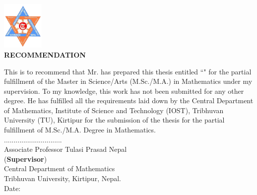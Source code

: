
\vspace{-1cm}
\begin{center}
	\includegraphics[width=0.15\textwidth]{pictures/tulogo.png}\\[1.5cm]
	{\Large{\bfseries{RECOMMENDATION}}}\\[.5cm]
      \end{center}

This is to recommend that Mr. \textbf{\theauthor} has prepared this thesis entitled ``\textbf{\thetitle}" for the partial fulfillment of the Master in Science/Arts (M.Sc./M.A.) in Mathematics under my supervision. To my knowledge, this work has not been submitted for any other degree.
He has fulfilled all the requirements laid down by the Central Department of Mathematics, Institute of Science and Technology (IOST), Tribhuvan University (TU), Kirtipur for the submission of the thesis for the partial fulfillment of M.Sc./M.A. Degree in Mathematics.\\

\vspace{1.5cm}
\noindent
..............................\\
Associate Professor Tulasi Prasad Nepal\\
(\textbf{Supervisor})\\
Central Department of Mathematics\\ Tribhuvan University, Kirtipur, Nepal.\\
Date: \thedate

\clearpage